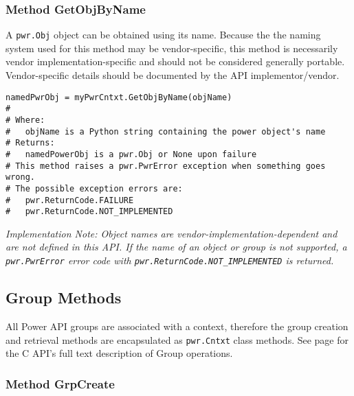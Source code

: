 \documentclass[12pt]{report} %
\begin{document}
\begin{appendices}
\subsubsection{Method GetObjByName} \label{meth:GetObjByName}

A \texttt{pwr.Obj} object can be obtained using its name. Because the
the naming system used for this method may be vendor-specific, this method is
necessarily vendor implementation-specific and should not be considered
generally portable. Vendor-specific details should be documented by the API
implementor/vendor.

\begin{center}\begin{minipage}{.95\linewidth}\begin{lstlisting}
namedPwrObj = myPwrCntxt.GetObjByName(objName)
#
# Where:
#   objName is a Python string containing the power object's name
# Returns:
#   namedPowerObj is a pwr.Obj or None upon failure
# This method raises a pwr.PwrError exception when something goes wrong.
# The possible exception errors are:
#   pwr.ReturnCode.FAILURE
#   pwr.ReturnCode.NOT_IMPLEMENTED
\end{lstlisting}\end{minipage}\end{center}

\emph{Implementation Note: Object names are vendor-implementation-dependent and
are not defined in this API. If the name of an object or group is not supported,
a \texttt{pwr.PwrError} error code with \texttt{pwr.ReturnCode.NOT_IMPLEMENTED}
is returned.}

\subsection{Group Methods} \label{sec:PythonGroupMethods}

All Power API groups are associated with a context, therefore the group
creation and retrieval methods are encapsulated as \texttt{pwr.Cntxt} class
methods. See page \pageref{sec:Group} for the C API's full text description of
Group operations.

\subsubsection{Method GrpCreate} \label{meth:GrpCreate}


\end{appendices}
\end{document}
